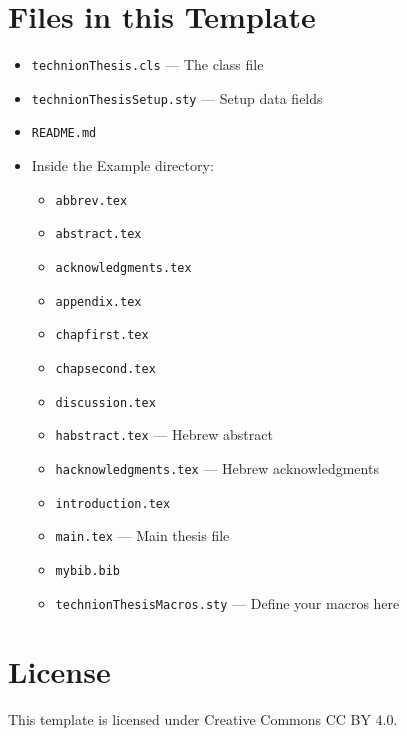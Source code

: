 \section{Files in this Template}

\begin{itemize}
    \item  \verb"technionThesis.cls"     ---  The class file
    \item  \verb"technionThesisSetup.sty"        ---  Setup data fields
    \item  \verb"README.md"                
    \item  Inside the Example directory:
        \begin{itemize}
    \item  \verb"abbrev.tex"               
    \item  \verb"abstract.tex"             
    \item  \verb"acknowledgments.tex"
    \item  \verb"appendix.tex"
    \item  \verb"chapfirst.tex"
    \item  \verb"chapsecond.tex"
    \item  \verb"discussion.tex"
    \item  \verb"habstract.tex"          ---  Hebrew abstract
    \item  \verb"hacknowledgments.tex"   ---  Hebrew acknowledgments
    \item  \verb"introduction.tex"
    \item  \verb"main.tex"               ---  Main thesis file
    \item  \verb"mybib.bib"
    \item  \verb"technionThesisMacros.sty"           ---  Define your macros here
\end{itemize}
\end{itemize}

\section{License}
This template is licensed under Creative Commons CC BY 4.0. 

